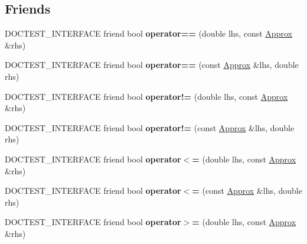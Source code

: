 \subsection*{Friends}
\begin{DoxyCompactItemize}
\item 
\mbox{\label{classdoctest_1_1_approx_a2b6b56551f113fd12f4a52b4d3e5fd7e}} 
D\+O\+C\+T\+E\+S\+T\+\_\+\+I\+N\+T\+E\+R\+F\+A\+CE friend bool {\bfseries operator==} (double lhs, const \mbox{\hyperlink{classdoctest_1_1_approx}{Approx}} \&rhs)
\item 
\mbox{\label{classdoctest_1_1_approx_a1b99d0c4c3924a253474e68ae30e1175}} 
D\+O\+C\+T\+E\+S\+T\+\_\+\+I\+N\+T\+E\+R\+F\+A\+CE friend bool {\bfseries operator==} (const \mbox{\hyperlink{classdoctest_1_1_approx}{Approx}} \&lhs, double rhs)
\item 
\mbox{\label{classdoctest_1_1_approx_a44d4bbc575291095c884848887538233}} 
D\+O\+C\+T\+E\+S\+T\+\_\+\+I\+N\+T\+E\+R\+F\+A\+CE friend bool {\bfseries operator!=} (double lhs, const \mbox{\hyperlink{classdoctest_1_1_approx}{Approx}} \&rhs)
\item 
\mbox{\label{classdoctest_1_1_approx_ae86972ba14656f422afdcc60cd2cdb08}} 
D\+O\+C\+T\+E\+S\+T\+\_\+\+I\+N\+T\+E\+R\+F\+A\+CE friend bool {\bfseries operator!=} (const \mbox{\hyperlink{classdoctest_1_1_approx}{Approx}} \&lhs, double rhs)
\item 
\mbox{\label{classdoctest_1_1_approx_af2fef67cf4508a446eeaf38dafae661f}} 
D\+O\+C\+T\+E\+S\+T\+\_\+\+I\+N\+T\+E\+R\+F\+A\+CE friend bool {\bfseries operator$<$=} (double lhs, const \mbox{\hyperlink{classdoctest_1_1_approx}{Approx}} \&rhs)
\item 
\mbox{\label{classdoctest_1_1_approx_a7f32e572caa5ee152b8ade301fcfd838}} 
D\+O\+C\+T\+E\+S\+T\+\_\+\+I\+N\+T\+E\+R\+F\+A\+CE friend bool {\bfseries operator$<$=} (const \mbox{\hyperlink{classdoctest_1_1_approx}{Approx}} \&lhs, double rhs)
\item 
\mbox{\label{classdoctest_1_1_approx_acf882dbff26c57cd8404da3edd46f45e}} 
D\+O\+C\+T\+E\+S\+T\+\_\+\+I\+N\+T\+E\+R\+F\+A\+CE friend bool {\bfseries operator$>$=} (double lhs, const \mbox{\hyperlink{classdoctest_1_1_approx}{Approx}} \&rhs)

\end{DoxyCompactItemize}
